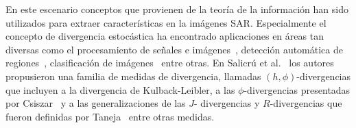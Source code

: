 \documentclass[12pt]{article}
\begin{document}
En este escenario conceptos que provienen de la teoría de la información han sido utilizados para extraer características en la imágenes SAR. Especialmente el concepto de divergencia estocástica ha encontrado aplicaciones en áreas tan diversas como el procesamiento de señales e imágenes~\cite {Aviyente2007}, detección automática de regiones~\cite{Nascimento2009,SilvaCribariFrery:ImprovedLikelihood:Environmetrics}, clasificación de imágenes~\cite{Puig2003} entre otras. 
En Salicrú et al.~\cite{Salicru1994} los autores propusieron una familia de medidas de divergencia, llamadas $(h,\phi)$-divergencias que incluyen a la divergencia de Kulback-Leibler, a las $\phi$-divergencias presentadas por Csiszar~\cite{Csiszar1967} y a las generalizaciones de las $J$- divergencias y $R$-divergencias que fueron definidas por Taneja~\cite{Taneja1989} entre otras medidas. 


%
%
\end{document}
